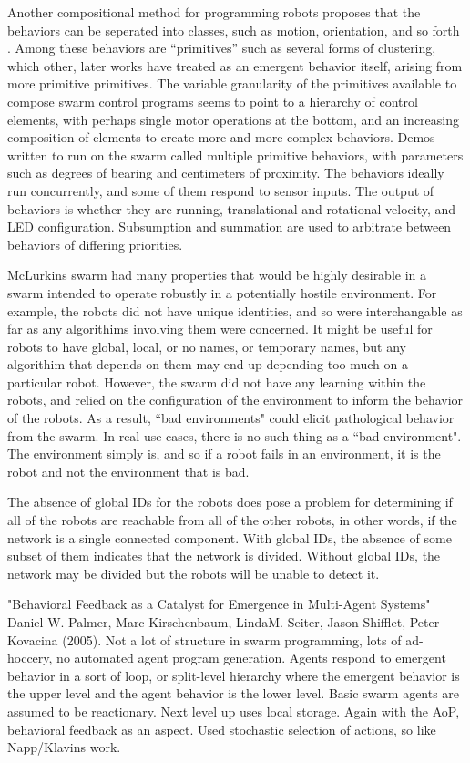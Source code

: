 \documentclass[]{article}
\begin{document}
Another compositional method for programming robots proposes that the behaviors can be seperated into classes, such as motion, orientation, and so forth \cite{mclurkin2004stupid}. 
Among these behaviors are ``primitives'' such as several forms of clustering, which other, later works have treated as an emergent behavior itself, arising from more primitive primitives. 
The variable granularity of the primitives available to compose swarm control programs seems to point to a hierarchy of control elements, with perhaps single motor operations at the bottom, and an increasing composition of elements to create more and more complex behaviors.
Demos written to run on the swarm called multiple primitive behaviors, with parameters such as degrees of bearing and centimeters of proximity. 
The behaviors ideally run concurrently, and some of them respond to sensor inputs. 
The output of behaviors is whether they are running, translational and rotational velocity, and LED configuration. 
Subsumption and summation are used to arbitrate between behaviors of differing priorities. 

McLurkins swarm had many properties that would be highly desirable in a swarm intended to operate robustly in a potentially hostile environment. 
For example, the robots did not have unique identities, and so were interchangable as far as any algorithims involving them were concerned. 
It might be useful for robots to have global, local, or no names, or temporary names, but any algorithim that depends on them may end up depending too much on a particular robot. 
However, the swarm did not have any learning within the robots, and relied on the configuration of the environment to inform the behavior of the robots. 
As a result, ``bad environments" could elicit pathological behavior from the swarm. 
In real use cases, there is no such thing as a ``bad environment". 
The environment simply is, and so if a robot fails in an environment, it is the robot and not the environment that is bad. 

The absence of global IDs for the robots does pose a problem for determining if all of the robots are reachable from all of the other robots, in other words, if the network is a single connected component. 
With global IDs, the absence of some subset of them indicates that the network is divided. 
Without global IDs, the network may be divided but the robots will be unable to detect it. 

"Behavioral Feedback as a Catalyst for Emergence in Multi-Agent Systems" \cite{palmer2005behavioral} Daniel W. Palmer, Marc Kirschenbaum, LindaM. Seiter, Jason Shifflet, Peter Kovacina (2005). Not a lot of structure in swarm programming, lots of ad-hoccery, no automated agent program generation. Agents respond to emergent behavior in a sort of loop, or split-level hierarchy where the emergent behavior is the upper level and the agent behavior is the lower level. Basic swarm agents are assumed to be reactionary. Next level up uses local storage. Again with the AoP, behavioral feedback as an aspect. Used stochastic selection of actions, so like Napp/Klavins work. 
\end{document}
